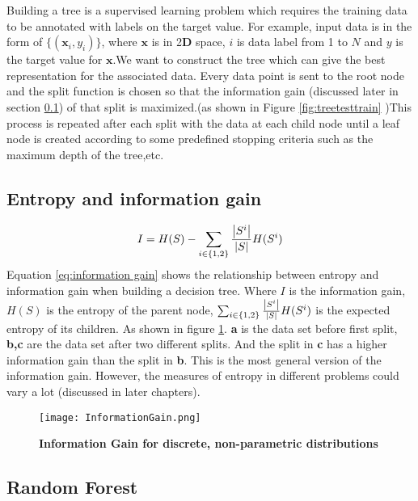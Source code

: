 Building a tree is a supervised learning problem which requires the training data to be annotated with labels on the target value. For example, input data is in the form of $ \{ (\mathbf{x}_{i},y_{i})\}$, where $\mathbf{x}$ is in 2$\mathbf{D}$ space, $i$ is data label from 1 to $N$ and $y$ is the target value for $\mathbf{x}$.We want to construct the tree which can give the best representation for the associated data. Every data point is sent to the root node and the split function is chosen so that the information gain (discussed later in section \ref{subsec:EIG}) of that split is maximized.(as shown in Figure \ref{fig:treetesttrain} )This process is repeated after each split with the data at each child node until a leaf node is created according to some predefined stopping criteria such as the maximum depth of the tree,etc. \cite{DRFHP}

\subsection{Entropy and information gain}
\label{subsec:EIG}

\begin{equation}
\label{eq:information gain}
	I=H(S) - \sum_{i \in \{1,2\}} \frac{\left\vert S^{i}\right\vert}{\left\vert S\right\vert}H(S^{i})
\end{equation}
Equation \eqref{eq:information gain} shows the relationship between entropy and information gain when building a decision tree. Where $\mathit{I}$ is the information gain, $\mathit{H(S)}$ is the entropy of the parent node, $\sum_{i \in \{1,2\}} \frac{\left\vert S^{i}\right\vert}{\left\vert S\right\vert}H(S^{i})$ is the expected entropy of its children. As shown in figure \ref{fig:IG}. \textbf{a} is the data set before first split, \textbf{b,c} are the data set after two different splits. And the split in \textbf{c} has a higher information gain than the split in \textbf{b}. This is the most general version of the information gain. However, the measures of entropy  in different problems could vary a lot (discussed in later chapters).

\begin{figure}
	\centering
	\texttt{[image: InformationGain.png]}
	\caption[Information Gain for discrete, non-parametric distributions]{\label{fig:IG}}  \textbf{Information Gain for discrete, non-parametric distributions} \cite{DFMS}
\end{figure}


\clearpage
\subsection{Random Forest}
\label{subsec:RF}


